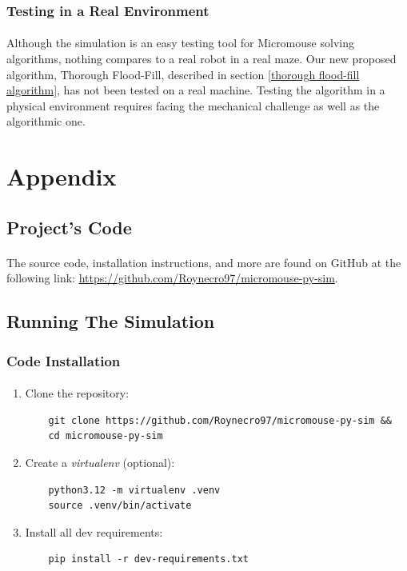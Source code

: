 \documentclass[12pt]{article}
\begin{document}
\subsubsection{Testing in a Real Environment}
\paragraph{}
Although the simulation is an easy testing tool for \gls{Micromouse} solving algorithms, nothing compares to a real robot in a real \gls{maze}.
Our new proposed algorithm, Thorough Flood-Fill, described in section \ref{thorough flood-fill algorithm}, has not been tested on a real machine.
Testing the algorithm in a physical environment requires facing the mechanical challenge as well as the algorithmic one.

\newpage

\section{Appendix}
\subsection{Project's Code} \label{Project Repo}
\paragraph{}
The source code, installation instructions, and more are found on GitHub at the following link: \url{https://github.com/Roynecro97/micromouse-py-sim}.

\begin{center}
\end{center}

\subsection{Running The Simulation}
\subsubsection{Code Installation}
\paragraph{}
\begin{enumerate}
    \item Clone the repository:
    \begin{verbatim}
    git clone https://github.com/Roynecro97/micromouse-py-sim &&
    cd micromouse-py-sim
    \end{verbatim}
    \item Create a \textit{virtualenv} (optional):
    \begin{verbatim}
    python3.12 -m virtualenv .venv
    source .venv/bin/activate
    \end{verbatim}
    \item Install all dev requirements:
    \begin{verbatim}
    pip install -r dev-requirements.txt
    \end{verbatim}
\end{enumerate}
\end{document}
